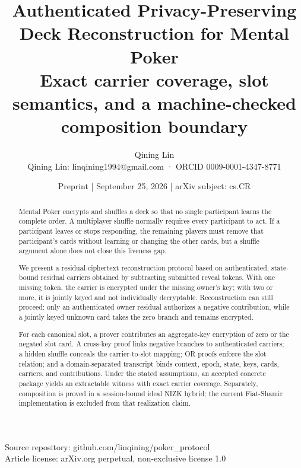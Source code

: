 \documentclass[11pt]{article}
\begin{document}
\title{\textbf{Authenticated Privacy-Preserving Deck Reconstruction for Mental Poker}\\\large Exact carrier coverage, slot semantics, and a machine-checked composition boundary}
\author{Qining Lin\\\small Qining Lin: linqining1994@gmail.com · ORCID 0009-0001-4347-8771}
\date{Preprint | September 25, 2026 | arXiv subject: cs.CR}
\maketitle
\thispagestyle{empty}

\begin{center}
\small Source repository: github.com/linqining/poker\_protocol\\
\small Article license: arXiv.org perpetual, non-exclusive license 1.0
\end{center}

\vspace{0.5em}

\begin{abstract}

Mental Poker encrypts and shuffles a deck so that no single participant learns the complete order. A multiplayer shuffle normally requires every participant to act. If a participant leaves or stops responding, the remaining players must remove that participant's cards without learning or changing the other cards, but a shuffle argument alone does not close this liveness gap.

We present a residual-ciphertext reconstruction protocol based on authenticated, state-bound residual carriers obtained by subtracting submitted reveal tokens. With one missing token, the carrier is encrypted under the missing owner's key; with two or more, it is jointly keyed and not individually decryptable. Reconstruction can still proceed: only an authenticated owner residual authorizes a negative contribution, while a jointly keyed unknown card takes the zero branch and remains encrypted.

For each canonical slot, a prover contributes an aggregate-key encryption of zero or the negated slot card. A cross-key proof links negative branches to authenticated carriers; a hidden shuffle conceals the carrier-to-slot mapping; OR proofs enforce the slot relation; and a domain-separated transcript binds context, epoch, state, keys, cards, carriers, and contributions. Under the stated assumptions, an accepted concrete package yields an extractable witness with exact carrier coverage. Separately, composition is proved in a session-bound ideal NIZK hybrid; the current Fiat-Shamir implementation is excluded from that realization claim.

\end{abstract}
\end{document}
